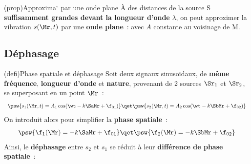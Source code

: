 \documentclass[../../main/main.tex]{subfiles}
\begin{document}
\begin{tcb*}[sidebyside, righthand ratio=.4](prop){Approxima$^\circ$ par une onde
			plane}
	À des distances de la source S \textbf{suffisamment grandes devant la longueur
		d'onde} $\lambda$, on peut approximer la vibration $s(\Mr,t)$ par une
	\textbf{onde plane}~:
	\psw{%
		\[\boxed{s(\Mr,t) = A\cos(\wt-k\SMr +\f_0)}\]
	}%
	avec $A$ constante au voisinage de M.
	\tcblower
	\begin{center}
		\vspace{-15pt}
		\captionsetup{justification=centering}
	\end{center}
\end{tcb*}

\subsection{Déphasage}
\begin{tcb*}[breakable](defi){Phase spatiale et déphasage}
	Soit deux signaux sinusoïdaux, de \textbf{même fréquence}, \textbf{longueur
		d'onde} et \textbf{nature}, provenant de 2 sources $\Sr_1$ et $\Sr_2$, se
	superposant en un point $\Mr$~:
	\[
		\psw{s_1(\Mr, t) = A_1\cos(\wt -k\SaMr + \f_{01})}
		\qet
		\psw{s_2(\Mr, t) = A_2\cos(\wt -k\SbMr + \f_{02})}
	\]
	On introduit alors pour simplifier la \textbf{phase spatiale}~:
	\[
		\psw{\f_1(\Mr) = -k\SaMr + \f_{01}}
		\qet
		\psw{\f_2(\Mr) = -k\SbMr + \f_{02}}
	\]
	Ainsi, le \textbf{déphasage} entre $s_2$ et $s_1$ se réduit à leur
	\textbf{différence de phase spatiale}~:
	\psw{%
		\[
			\D\f_{2/1}(\Mr) =
			(\wt \underbracket[1pt]{-k\SaMr + \f_{02}}_{\f_2(\Mr)}) -
			(\wt \underbracket[1pt]{-k\SbMr + \f_{01}}_{\f_1(\Mr)})
			\Lra
			\boxed{\D\f_{2/1}(\Mr) = \f_2(\Mr) - \f_1(\Mr)}
		\]
	}%
	\vspace{-15pt}
\end{tcb*}
\end{document}
